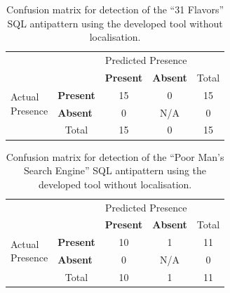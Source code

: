 \begin{table}[H]
    \centering
    \caption{Confusion matrix for detection of the “31 Flavors” SQL antipattern using the developed tool without localisation.}
    \begin{tabular}{l|l|c|c|c}
        \multicolumn{2}{c}{}&\multicolumn{2}{c}{Predicted Presence}&\\
        \cline{3-4}
        \multicolumn{2}{c|}{}&\textbf{Present}&\textbf{Absent}&\multicolumn{1}{c}{Total}\\
        \cline{2-4}
        \multirow{2}{1.5cm}{Actual\\Presence}& \textbf{Present} & 15 & 0 & 15\\
        \cline{2-4}
        & \textbf{Absent} & 0 & N/A & 0\\
        \cline{2-4}
        \multicolumn{1}{c}{} & \multicolumn{1}{c}{Total} & \multicolumn{1}{c}{15} & \multicolumn{1}{c}{0} & \multicolumn{1}{c}{15}\\
    \end{tabular}
\end{table}

\begin{table}[H]
    \centering
    \caption{Confusion matrix for detection of the “Poor Man's Search Engine” SQL antipattern using the developed tool without localisation.}
    \begin{tabular}{l|l|c|c|c}
        \multicolumn{2}{c}{}&\multicolumn{2}{c}{Predicted Presence}&\\
        \cline{3-4}
        \multicolumn{2}{c|}{}&\textbf{Present}&\textbf{Absent}&\multicolumn{1}{c}{Total}\\
        \cline{2-4}
        \multirow{2}{1.5cm}{Actual\\Presence}& \textbf{Present} & 10 & 1 & 11\\
        \cline{2-4}
        & \textbf{Absent} & 0 & N/A & 0\\
        \cline{2-4}
        \multicolumn{1}{c}{} & \multicolumn{1}{c}{Total} & \multicolumn{1}{c}{10} & \multicolumn{1}{c}{1} & \multicolumn{1}{c}{11}\\
    \end{tabular}
\end{table}

